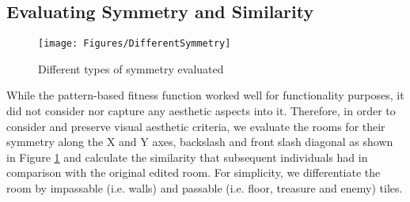 
\subsection{Evaluating Symmetry and Similarity}

\begin{figure}
\texttt{[image: Figures/DifferentSymmetry]}
\caption{Different types of symmetry evaluated}
\label{p2fig:symmetry-types}
\end{figure}

While the pattern-based fitness function worked well for functionality purposes, it did not consider nor capture any aesthetic aspects into it. Therefore, in order to consider and preserve visual aesthetic criteria, we evaluate the rooms for their symmetry  along the X and Y axes, backslash and front slash diagonal as shown in Figure \ref{p2fig:symmetry-types} and calculate the similarity that subsequent individuals had in comparison with the original edited room. For simplicity, we differentiate the room by impassable (i.e. walls) and passable (i.e. floor, treasure and enemy) tiles.



